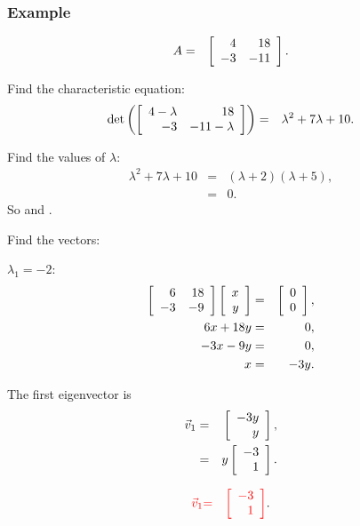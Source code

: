 \begin{frame}
  \frametitle{Example}

  \begin{eqnarray*}
    A & = & \left[ \begin{array}{rr} 4 & 18 \\ -3 & -11 \end{array} \right].
  \end{eqnarray*}

  {
    Find the characteristic equation:
    \begin{eqnarray*}
      \det\left(\left[ \begin{array}{rr} 4-\lambda & 18 \\ -3 & -11-\lambda \end{array} \right]\right) & = & \lambda^2+7\lambda+10.
    \end{eqnarray*}
    
    Find the values of $\lambda$:
    \begin{eqnarray*}
      \lambda^2+7\lambda+10 & = & (\lambda+2)(\lambda+5), \\
      & = & 0.
    \end{eqnarray*}
    So  and .
  }

\end{frame}


\begin{frame}
  Find the vectors:

  $\lambda_1 = -2$:
  \begin{eqnarray*}
    \left[ \begin{array}{rr} 6 & 18 \\ -3 & -9 \end{array} \right] \left[ \begin{array}{r} x \\ y \end{array} \right] & = & \left[ \begin{array}{r} 0 \\ 0 \end{array} \right], \\
    6x + 18y & = & 0, \\
    -3x - 9y & = & 0, \\
    x & = & -3y.
  \end{eqnarray*}

  The first eigenvector is 
  \begin{eqnarray*}
    \vec{v}_1 & = & \left[ \begin{array}{r} -3y \\ y \end{array} \right], \\
    & = & y \left[ \begin{array}{r} -3 \\ 1 \end{array} \right].
  \end{eqnarray*}

  \begin{eqnarray*}
    {\color{red}\vec{v}_1} & {\color{red}=} & {\color{red}\left[ \begin{array}{r} -3 \\ 1 \end{array} \right]}.
  \end{eqnarray*}

\end{frame}

